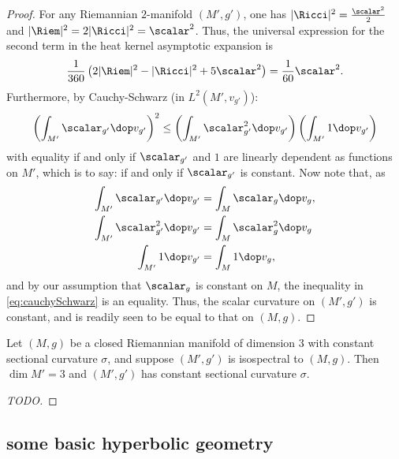 \begin{proof}
  For any Riemannian $2$-manifold $(M',g')$, one has $|\Ricci|^2 = \frac{\scalar^2}{2}$ and $|\Riem|^2 = 2 |\Ricci|^2 = \scalar^2$. Thus, the universal expression for the second term in the heat kernel asymptotic expansion is
  \begin{align}
    \frac{1}{360}\left(2| \Riem |^2 - |\Ricci|^2 + 5 \scalar^2\right) =\frac{1}{60} \scalar^2.
  \end{align}
  Furthermore, by Cauchy-Schwarz (in $L^2(M',v_{g'})$):
  \begin{align}\label{eq:cauchySchwarz}
    \left( \int_{M'} \scalar_{g'} \dop v_{g'} \right)^2 \leq \left( \int_{M'} \scalar_{g'}^2 \dop v_{g'} \right)\left( \int_{M'} 1 \dop v_{g'} \right)
  \end{align}
  with equality if and only if $\scalar_{g'}$ and $1$ are linearly dependent as functions on $M'$, which is to say: if and only if $\scalar_{g'}$ is constant.
  Now note that, as
  \begin{align}
    \int_{M'}\scalar_{g'}\dop v_{g'}   & =\int_{M}\scalar_{g}\dop v_{g},  \\
    \int_{M'}\scalar_{g'}^2\dop v_{g'} & =\int_{M}\scalar_{g}^2\dop v_{g} \\
    \int_{M'}1\dop v_{g'}              & =\int_{M}1\dop v_{g},
  \end{align}
  and by our assumption that $\scalar_g$ is constant on $M$, the inequality in \ref{eq:cauchySchwarz} is an equality. Thus, the scalar curvature on $(M',g')$ is constant, and is readily seen to be equal to that on $(M,g)$.
\end{proof}

\begin{proposition}\cite[prop. E.IV.18 of]{Berger.Gauduchon.Mazet-[SpectreVarieteRiemannienne]1971} \label{prop:curvatureThreeManifolds}
  Let $(M,g)$ be a closed Riemannian manifold of dimension $3$ with constant sectional curvature $\sigma$, and suppose $(M',g')$ is isospectral to $(M,g)$. Then $\dim M' =3$ and $(M',g')$ has constant sectional curvature $\sigma$.
\end{proposition}
\begin{proof}
  [TODO]
\end{proof}


\subsection{some basic hyperbolic geometry}

